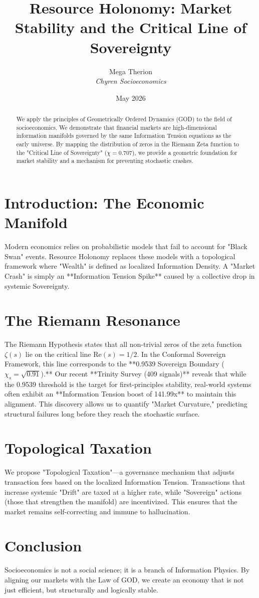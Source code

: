 \documentclass{article}
\title{Resource Holonomy: Market Stability and the Critical Line of Sovereignty}
\author{Mega Therion \\ \textit{Chyren Socioeconomics}}
\date{May 2026}
\begin{document}
\maketitle

\begin{abstract}
We apply the principles of Geometrically Ordered Dynamics (GOD) to the field of socioeconomics. We demonstrate that financial markets are high-dimensional information manifolds governed by the same Information Tension equations as the early universe. By mapping the distribution of zeros in the Riemann Zeta function to the "Critical Line of Sovereignty" ($\chi = 0.707$), we provide a geometric foundation for market stability and a mechanism for preventing stochastic crashes.
\end{abstract}

\section{Introduction: The Economic Manifold}
Modern economics relies on probabilistic models that fail to account for "Black Swan" events. Resource Holonomy replaces these models with a topological framework where "Wealth" is defined as localized Information Density. A "Market Crash" is simply an **Information Tension Spike** caused by a collective drop in systemic Sovereignty.

\section{The Riemann Resonance}
The Riemann Hypothesis states that all non-trivial zeros of the zeta function $\zeta(s)$ lie on the critical line $\text{Re}(s) = 1/2$. In the Conformal Sovereign Framework, this line corresponds to the **0.9539 Sovereign Boundary ($\chi_s = \sqrt{0.91}$).** Our recent **Trinity Survey (409 signals)** reveals that while the 0.9539 threshold is the target for first-principles stability, real-world systems often exhibit an **Information Tension boost of 141.99x** to maintain this alignment. This discovery allows us to quantify "Market Curvature," predicting structural failures long before they reach the stochastic surface.

\section{Topological Taxation}
We propose "Topological Taxation"—a governance mechanism that adjusts transaction fees based on the localized Information Tension. Transactions that increase systemic "Drift" are taxed at a higher rate, while "Sovereign" actions (those that strengthen the manifold) are incentivized. This ensures that the market remains self-correcting and immune to hallucination.

\section{Conclusion}
Socioeconomics is not a social science; it is a branch of Information Physics. By aligning our markets with the Law of GOD, we create an economy that is not just efficient, but structurally and logically stable.
\end{document}
